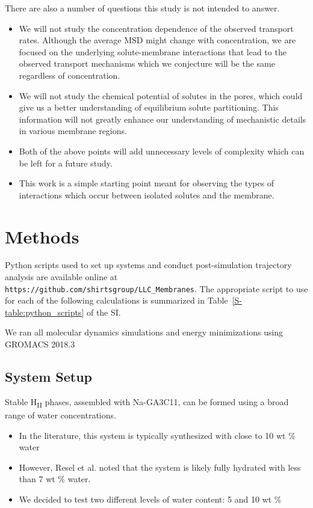 \documentclass{article}
\begin{document}
  \noindent There are also a number of questions this study is not intended 
  to answer.
  \begin{itemize}
    \item We will not study the concentration dependence of the observed
    transport rates. Although the average MSD might change with concentration,
    we are focused on the underlying solute-membrane interactions that lead to
    the observed transport mechanisms which we conjecture will be the same 
    regardless of concentration.
    \item We will not study the chemical potential of solutes in the pores, which
    could give us a better understanding of equilibrium solute partitioning.
    This information will not greatly enhance our understanding of 
    mechanistic details in various membrane regions.
    \item Both of the above points will add unnecessary levels of complexity
    which can be left for a future study. 
    \item This work is a simple starting point meant for observing the types
    of interactions which occur between isolated solutes and the membrane.
  \end{itemize}

  \section{Methods}
  
  Python scripts used to set up systems and conduct post-simulation trajectory 
  analysis are available online at \texttt{https://github.com/shirtsgroup/LLC\_Membranes}.
  The appropriate script to use for each of the following calculations is summarized
  in Table~\ref{S-table:python_scripts} of the SI.
  
  \noindent We ran all molecular dynamics simulations and energy minimizations 
  using GROMACS 2018.3 \cite{bekker_gromacs:_1993,berendsen_gromacs:_1995,van_der_spoel_gromacs:_2005,hess_gromacs_2008} 
  
  \subsection*{System Setup}\label{method:system_setup}

  Stable H\textsubscript{II} phases, assembled with Na-GA3C11, can be formed
  using a broad range of water concentrations.
  \begin{itemize}
	\item In the literature, this system is typically synthesized with close
	to 10 wt \% water \cite{smith_ordered_1997, zhou_new_2007}
    \item However, Resel et al. noted that the system is likely fully 
	hydrated with less than 7 wt \% water. \cite{resel_h2-phase_2000}
	\item We decided to test two different levels of water content: 5 and 10 wt \%
  \end{itemize} 
\end{document}
